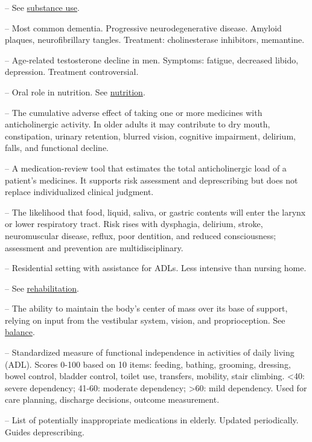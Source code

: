 -- See \hyperlink{Substance Use}{substance use}.

-- Most common dementia. Progressive neurodegenerative disease. Amyloid plaques, neurofibrillary tangles. Treatment: cholinesterase inhibitors, memantine.

-- Age-related testosterone decline in men. Symptoms: fatigue, decreased libido, depression. Treatment controversial.

-- Oral role in nutrition. See \hyperlink{Nutrition}{nutrition}.

-- The cumulative adverse effect of taking one or more medicines with anticholinergic activity. In older adults it may contribute to dry mouth, constipation, urinary retention, blurred vision, cognitive impairment, delirium, falls, and functional decline.

-- A medication-review tool that estimates the total anticholinergic load of a patient's medicines. It supports risk assessment and deprescribing but does not replace individualized clinical judgment.

-- The likelihood that food, liquid, saliva, or gastric contents will enter the larynx or lower respiratory tract. Risk rises with dysphagia, delirium, stroke, neuromuscular disease, reflux, poor dentition, and reduced consciousness; assessment and prevention are multidisciplinary.

-- Residential setting with assistance for ADLs. Less intensive than nursing home.

-- See \hyperlink{Rehabilitation}{rehabilitation}.

-- The ability to maintain the body's center of mass over its base of support, relying on input from the vestibular system, vision, and proprioception. See \hyperlink{Balance}{balance}.

-- Standardized measure of functional independence in activities of daily living (ADL). Scores 0-100 based on 10 items: feeding, bathing, grooming, dressing, bowel control, bladder control, toilet use, transfers, mobility, stair climbing. <40: severe dependency; 41-60: moderate dependency; >60: mild dependency. Used for care planning, discharge decisions, outcome measurement.

-- List of potentially inappropriate medications in elderly. Updated periodically. Guides deprescribing.

